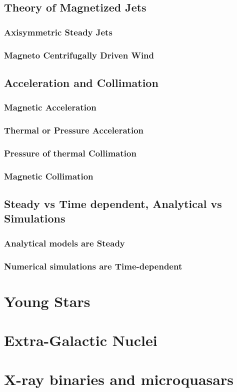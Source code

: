 \documentclass[10pt,a4paper,english]{article}
\begin{document}
\subsection{Theory of Magnetized Jets}
\subsubsection{Axisymmetric Steady Jets}
\subsubsection{Magneto Centrifugally Driven Wind}
\subsection{Acceleration and Collimation}
\subsubsection{Magnetic Acceleration}
\subsubsection{Thermal or Pressure Acceleration}
\subsubsection{Pressure of thermal Collimation}
\subsubsection{Magnetic Collimation}
\subsection{Steady vs Time dependent, Analytical vs Simulations}
\subsubsection{Analytical models are Steady}
\subsubsection{Numerical simulations are Time-dependent}

\section{Young Stars}
\section{Extra-Galactic Nuclei}
\section{X-ray binaries and microquasars}

\appendix

\makeatletter
\def\@seccntformat#1{Appendix~\csname the#1\endcsname:\quad}
\makeatother

\newpage



\end{document}
